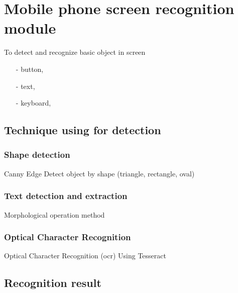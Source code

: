 \chapter{Mobile phone screen recognition module}
To detect and recognize basic object in screen
\begin{itemize}
	\item[-] button,
	\item[-] text,
	\item[-] keyboard,
\end{itemize}

\section{Technique using for detection}
\subsection{Shape detection}
Canny Edge
Detect object by shape (triangle, rectangle, oval)

\subsection{Text detection and extraction}
Morphological operation method

\subsection{Optical Character Recognition}
Optical Character Recognition (\gls{ocr})
Using Tesseract

\section{Recognition result}
